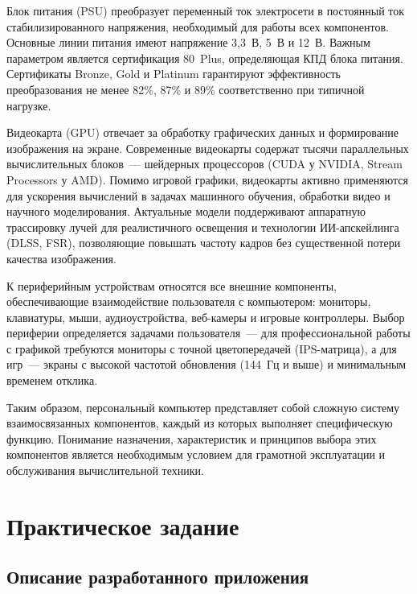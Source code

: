 \documentclass[14pt,a4paper]{extarticle}
\begin{document}
Блок питания (PSU) преобразует переменный ток электросети в постоянный ток стабилизированного напряжения, необходимый для работы всех компонентов. Основные линии питания имеют напряжение 3{,}3~В, 5~В и 12~В. Важным параметром является сертификация 80~Plus, определяющая КПД блока питания. Сертификаты Bronze, Gold и Platinum гарантируют эффективность преобразования не менее 82\%, 87\% и 89\% соответственно при типичной нагрузке.

Видеокарта (GPU) отвечает за обработку графических данных и формирование изображения на экране. Современные видеокарты содержат тысячи параллельных вычислительных блоков~--- шейдерных процессоров (CUDA у NVIDIA, Stream Processors у AMD). Помимо игровой графики, видеокарты активно применяются для ускорения вычислений в задачах машинного обучения, обработки видео и научного моделирования. Актуальные модели поддерживают аппаратную трассировку лучей для реалистичного освещения и технологии ИИ-апскейлинга (DLSS, FSR), позволяющие повышать частоту кадров без существенной потери качества изображения.

К периферийным устройствам относятся все внешние компоненты, обеспечивающие взаимодействие пользователя с компьютером: мониторы, клавиатуры, мыши, аудиоустройства, веб-камеры и игровые контроллеры. Выбор периферии определяется задачами пользователя~--- для профессиональной работы с графикой требуются мониторы с точной цветопередачей (IPS-матрица), а для игр~--- экраны с высокой частотой обновления (144~Гц и выше) и минимальным временем отклика.

Таким образом, персональный компьютер представляет собой сложную систему взаимосвязанных компонентов, каждый из которых выполняет специфическую функцию. Понимание назначения, характеристик и принципов выбора этих компонентов является необходимым условием для грамотной эксплуатации и обслуживания вычислительной техники.

\newpage
\section{Практическое задание}

\subsection{Описание разработанного приложения}
\end{document}
